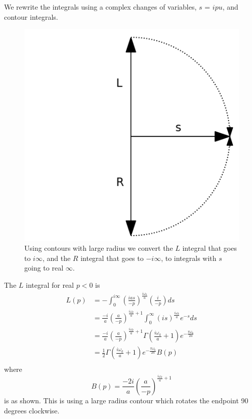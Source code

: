 \documentclass[12pt,a4paper]{article}
\begin{document}
We rewrite the integrals using a complex changes of variables, $s$ = $ipu$, and contour integrals.

\begin{figure}[h]
\centering
\includegraphics[scale=0.6]{contour.png}
\caption{Using contours with large radius we convert the $L$ integral that goes to $i\infty$, and the $R$ integral that goes to $-i\infty$, to integrals with $s$ going to real $\infty$.}
\label{fig:x cubed graph}
\end{figure}


The $L$ integral for real $p<0$ is
\begin{equation}
\begin{split}
  L(p) & = -\int_0^{i\infty} \left(\frac{ias}{-p}\right)^\frac{i\omega_k}{a} \left(\frac{i}{-p}\right)ds \\
  & = \frac{-i}{a} \left(\frac{a}{-p}\right)^{\frac{i\omega_k}{a} + 1} \int_0^\infty \left(is\right) ^ \frac{i\omega_k}{a} e^{-s} ds \\
  & = \frac{-i}{a} \left(\frac{a}{-p}\right)^{\frac{i\omega_k}{a} + 1} \Gamma\left(\frac{i\omega_k}{a} + 1\right) e^{-\frac{\pi \omega_k}{2a}} \\
  & = \frac{1}{2} \Gamma\left(\frac{i\omega_k}{a} + 1\right) e^{-\frac{\pi \omega_k}{2a}} B(p)\\
\end{split}
\end{equation}
where
\begin{equation}
B(p) = \frac{-2i}{a} \left(\frac{a}{-p}\right)^{\frac{i\omega_k}{a} + 1} 
\end{equation}
is as shown.  This is using a large radius contour which rotates the endpoint 90 degrees clockwise.
\end{document}
